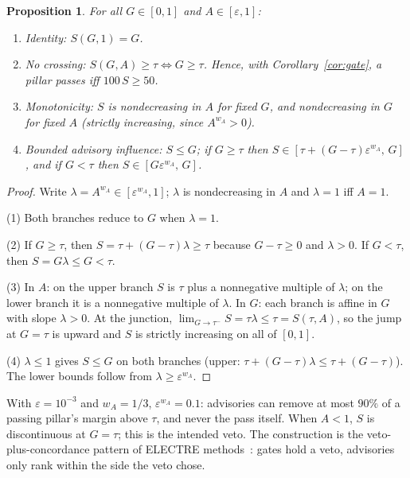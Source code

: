 \documentclass[11pt]{article}
\newtheorem{proposition}{Proposition}
\theoremstyle{remark}
\newcommand{\wA}{w_A}
\begin{document}
\begin{proposition}\label{prop:band}
For all $G \in [0,1]$ and $A \in [\varepsilon, 1]$:
\begin{enumerate}
  \item \emph{Identity:} $S(G, 1) = G$.
  \item \emph{No crossing:} $S(G, A) \ge \tau \iff G \ge \tau$. Hence, with
        Corollary~\ref{cor:gate}, a pillar passes iff $100\,S \ge 50$.
  \item \emph{Monotonicity:} $S$ is nondecreasing in $A$ for fixed $G$, and
        nondecreasing in $G$ for fixed $A$ (strictly increasing, since
        $A^{\wA} > 0$).
  \item \emph{Bounded advisory influence:} $S \le G$; if $G \ge \tau$ then
        $S \in [\tau + (G - \tau)\varepsilon^{\wA},\, G]$, and if $G < \tau$ then
        $S \in [G \varepsilon^{\wA},\, G]$.
\end{enumerate}
\end{proposition}

\begin{proof}
Write $\lambda = A^{\wA} \in [\varepsilon^{\wA}, 1]$; $\lambda$ is
nondecreasing in $A$ and $\lambda = 1$ iff $A = 1$.

(1) Both branches reduce to $G$ when $\lambda = 1$.

(2) If $G \ge \tau$, then $S = \tau + (G - \tau)\lambda \ge \tau$ because
$G - \tau \ge 0$ and $\lambda > 0$. If $G < \tau$, then
$S = G\lambda \le G < \tau$.

(3) In $A$: on the upper branch $S$ is $\tau$ plus a nonnegative multiple of
$\lambda$; on the lower branch it is a nonnegative multiple of $\lambda$.
In $G$: each branch is affine in $G$ with slope $\lambda > 0$. At the junction,
$\lim_{G \to \tau^-} S = \tau\lambda \le \tau = S(\tau, A)$, so the jump at
$G = \tau$ is upward and $S$ is strictly increasing on all of $[0,1]$.

(4) $\lambda \le 1$ gives $S \le G$ on both branches (upper:
$\tau + (G-\tau)\lambda \le \tau + (G - \tau)$). The lower bounds follow from
$\lambda \ge \varepsilon^{\wA}$.
\end{proof}

With $\varepsilon = 10^{-3}$ and $\wA = 1/3$, $\varepsilon^{\wA} = 0.1$: advisories
can remove at most $90\%$ of a passing pillar's margin above $\tau$, and never
the pass itself. When $A < 1$, $S$ is discontinuous at $G = \tau$; this is the
intended veto. The construction is the veto-plus-concordance pattern of ELECTRE
methods~\cite{roy1991}: gates hold a veto, advisories only rank within the side
the veto chose.
\end{document}
